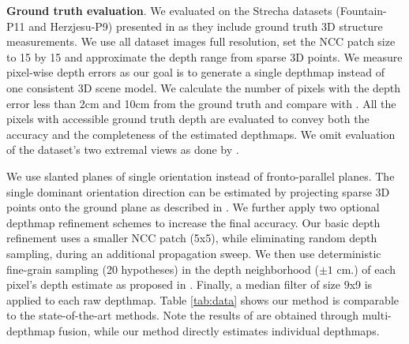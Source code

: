
{\bf Ground truth evaluation}. We evaluated on the Strecha datasets (Fountain-P11 and Herzjesu-P9) presented in \citet{Strecha08}  as  they include ground truth 3D structure measurements.
We use all dataset images full resolution, set the  NCC patch size to 15 by 15 and  approximate the depth range from sparse 3D points.
We measure pixel-wise depth errors as our goal is to ge\-ne\-rate a single depthmap instead of one consistent 3D scene model.
We calculate the number of pixels with the depth error less than 2cm and 10cm from the ground truth and compare with \cite{LeastCommitment_3DIMPVT2012, FURUKAWA_PAMI2010, Zaharescu_PAMI2011,TYL,JAN}.
All the pixels with accessible ground truth depth are evaluated to convey both the accuracy and the completeness of the estimated depthmaps.
We omit evaluation of the dataset's two extremal views as done by \citet{LeastCommitment_3DIMPVT2012}.

We use slanted planes of single orientation instead of fronto-parallel planes.
The single dominant orientation direction can be estimated by projecting sparse 3D points onto the ground plane as described in \citet{Gallup07}.
We further apply two optional depthmap refinement schemes to increase the final accuracy.
Our basic depth refinement uses a smaller NCC patch (5x5), while eliminating random depth sampling, during an additional propagation sweep. We then use deterministic fine-grain sampling (20 hypotheses) in the depth neighborhood ($\pm 1$ cm.) of each  pixel's depth estimate as proposed in \citet{Shen_TIP2013}.
Finally, a median filter of size 9x9 is applied  to each raw depthmap. %
Table \ref{tab:data} shows our method is comparable to the state-of-the-art methods. Note the results of \citet{LeastCommitment_3DIMPVT2012, TYL, JAN} are obtained through multi-depthmap fusion, while our method directly estimates  individual depthmaps.

